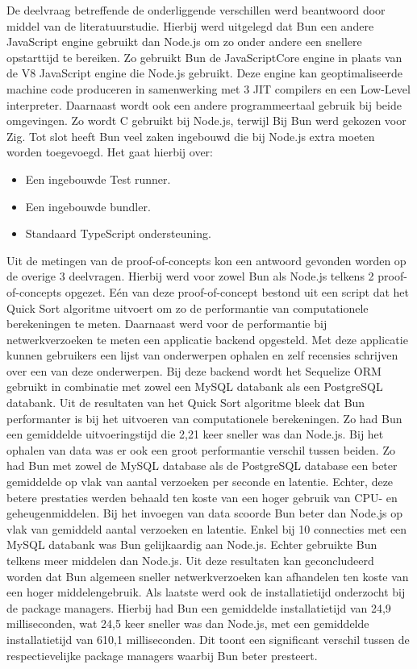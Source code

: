 De deelvraag betreffende de onderliggende verschillen werd beantwoord door middel van de literatuurstudie.
Hierbij werd uitgelegd dat Bun een andere JavaScript engine gebruikt dan Node.js om zo onder andere een snellere opstarttijd te bereiken.
Zo gebruikt Bun de JavaScriptCore engine in plaats van de V8 JavaScript engine die Node.js gebruikt.
Deze engine kan geoptimaliseerde machine code produceren in samenwerking met 3 JIT compilers en een Low-Level interpreter.
Daarnaast wordt ook een andere programmeertaal gebruik bij beide omgevingen. Zo wordt C gebruikt bij Node.js, terwijl Bij Bun werd gekozen voor Zig.
Tot slot heeft Bun veel zaken ingebouwd die bij Node.js extra moeten worden toegevoegd.
Het gaat hierbij over:
\begin{itemize}
    \item Een ingebouwde Test runner.
    \item Een ingebouwde bundler.
    \item Standaard TypeScript ondersteuning.
\end{itemize}
Uit de metingen van de proof-of-concepts kon een antwoord gevonden worden op de overige 3 deelvragen.
Hierbij werd voor zowel Bun als Node.js telkens 2 proof-of-concepts opgezet. 
Eén van deze proof-of-concept bestond uit een script dat het Quick Sort algoritme uitvoert om zo de performantie van computationele berekeningen te meten.
Daarnaast werd voor de performantie bij netwerkverzoeken te meten een applicatie backend opgesteld. Met deze applicatie kunnen gebruikers
een lijst van onderwerpen ophalen en zelf recensies schrijven over een van deze onderwerpen.
Bij deze backend wordt het Sequelize ORM gebruikt in combinatie met zowel een MySQL databank als een PostgreSQL databank.
Uit de resultaten van het Quick Sort algoritme bleek dat Bun performanter is bij het uitvoeren van computationele berekeningen.
Zo had Bun een gemiddelde uitvoeringstijd die 2,21 keer sneller was dan Node.js.
Bij het ophalen van data was er ook een groot performantie verschil tussen beiden. Zo had Bun met zowel de MySQL database als de PostgreSQL database 
een beter gemiddelde op vlak van aantal verzoeken per seconde en latentie. Echter, deze betere prestaties werden behaald ten koste van een hoger gebruik van CPU- en geheugenmiddelen.
Bij het invoegen van data scoorde Bun beter dan Node.js op vlak van gemiddeld aantal verzoeken en latentie.
Enkel bij 10 connecties met een MySQL databank was Bun gelijkaardig aan Node.js.
Echter gebruikte Bun telkens meer middelen dan Node.js.
Uit deze resultaten kan geconcludeerd worden dat Bun algemeen sneller netwerkverzoeken kan afhandelen
ten koste van een hoger middelengebruik.
Als laatste werd ook de installatietijd onderzocht bij de package managers. Hierbij had Bun een 
gemiddelde installatietijd van 24,9 milliseconden, wat 24,5 keer sneller was dan Node.js, met een gemiddelde installatietijd van 610,1 milliseconden.
Dit toont een significant verschil tussen de respectievelijke package managers waarbij Bun beter presteert.

